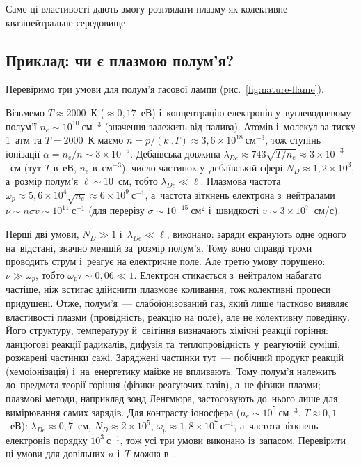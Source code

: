 Саме ці властивості дають змогу розглядати плазму як колективне квазінейтральне
середовище.

\subsection*{Приклад: чи є плазмою полум'я?}\label{sec:flame-check}

Перевіримо три умови для полум'я гасової лампи (рис.~\ref{fig:nature-flame}).

\begin{Estimate}
Візьмемо $T\approx2000$~К ($\approx0{,}17$~еВ) і~концентрацію електронів у~вуглеводневому полум'ї $n_e\sim10^{10}~\mathrm{см}^{-3}$ (значення залежить від палива).
Атомів і~молекул за тиску 1~атм та $T=2000$~К маємо $n=p/(k_{\mathrm B}T)\approx3{,}6\times10^{18}~\mathrm{см}^{-3}$, тож ступінь іонізації $\alpha=n_e/n\sim3\times10^{-9}$.
Дебаївська довжина $\lambda_{De}\approx743\sqrt{T/n_e}\approx3\times10^{-3}$~см (тут $T$ в~еВ, $n_e$ в~$\mathrm{см}^{-3}$), число частинок у~дебаївській сфері $N_D\approx1{,}2\times10^{3}$,
а~розмір полум'я $\ell\sim10$~см, тобто $\lambda_{De}\ll\ell$.
Плазмова частота $\omega_p\approx5{,}6\times10^{4}\sqrt{n_e}\approx6\times10^{9}~\mathrm{с}^{-1}$, а~частота зіткнень електрона з~нейтралами
$\nu\sim n\sigma v\sim10^{11}~\mathrm{с}^{-1}$ (для перерізу $\sigma\sim10^{-15}~\mathrm{см}^2$ і~швидкості $v\sim3\times10^{7}$~см/с).
\end{Estimate}
Перші дві умови, $N_D\gg1$ і~$\lambda_{De}\ll\ell$, виконано: заряди екранують одне одного на~відстані, значно меншій за~розмір полум'я. Тому воно справді трохи проводить струм і~реагує на електричне поле. Але третю умову порушено: $\nu\gg\omega_p$, тобто $\omega_p\tau\sim0{,}06\ll1$.
Електрон стикається з~нейтралом набагато частіше, ніж встигає здійснити плазмове коливання, тож колективні процеси придушені.
Отже, полум'я~--- слабоіонізований газ, який лише частково виявляє властивості плазми (провідність, реакцію на поле), але не колективну поведінку. Його структуру, температуру й~світіння визначають хімічні реакції горіння: ланцюгові реакції радикалів, дифузія та~теплопровідність у~реагуючій суміші, розжарені частинки сажі. Заряджені частинки тут~--- побічний продукт реакцій (хемоіонізація) і~на~енергетику майже не впливають. Тому полум'я належить до~предмета теорії горіння (фізики реагуючих газів), а~не фізики плазми; плазмові методи, наприклад зонд Ленгмюра, застосовують до~нього лише для вимірювання самих зарядів.
Для контрасту іоносфера ($n_e\sim10^{5}~\mathrm{см}^{-3}$, $T\approx0{,}1$~еВ): $\lambda_{De}\approx0{,}7$~см, $N_D\approx2\times10^{5}$, $\omega_p\approx1{,}8\times10^{7}~\mathrm{с}^{-1}$,
а~частота зіткнень електронів порядку $10^{3}~\mathrm{с}^{-1}$, тож усі три умови виконано із~запасом. Перевірити ці умови для довільних $n$ і~$T$ можна в~.


